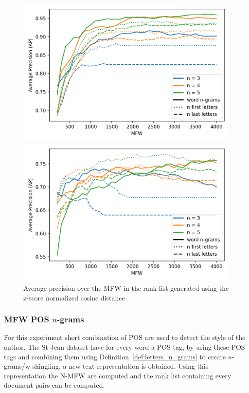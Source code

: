 \begin{figure}
  \centering
  \caption{Average precision over the MFW in the rank list generated using the z-score normalized cosine distance}

  \label{fig:first_last_letters_ngrams_oxquarry}
  \includegraphics[width=\linewidth]{img/first_last_letters_ngrams_oxquarry.png}

  \label{fig:first_last_letters_ngrams_brunet}
  \includegraphics[width=\linewidth]{img/first_last_letters_ngrams_brunet.png}
\end{figure}

\subsubsection{MFW POS $n$-grams}

For this experiment short combination of POS are used to detect the style of the author.
The St-Jean dataset have for every word a POS tag, by using these POS tags and combining them using Definition~\ref{def:letters_n_grams} to create $n$-grams/w-shingling, a new text representation is obtained.
Using this representation the N-MFW are computed and the rank list containing every document pairs can be computed.

